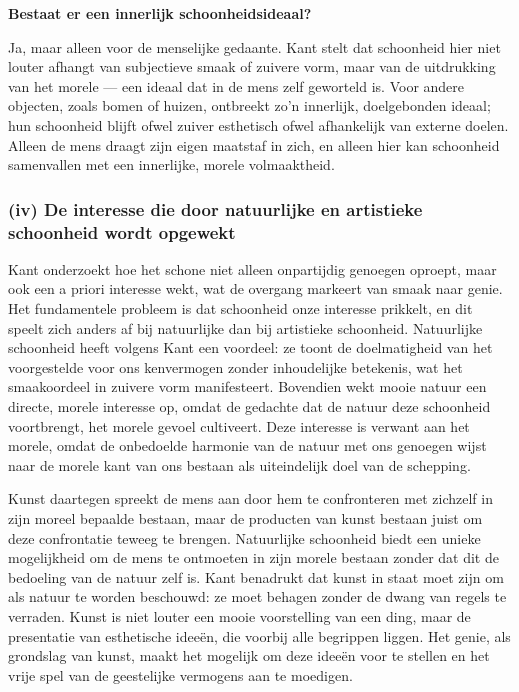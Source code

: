 \documentclass[11pt,twoside,openright]{memoir}
\begin{document}
\bigskip
\noindent
\textbf{Bestaat er een innerlijk schoonheidsideaal?}
\medskip

Ja, maar alleen voor de menselijke gedaante. Kant stelt dat schoonheid hier niet louter afhangt van subjectieve smaak of zuivere vorm, maar van de uitdrukking van het morele — een ideaal dat in de mens zelf geworteld is. Voor andere objecten, zoals bomen of huizen, ontbreekt zo’n innerlijk, doelgebonden ideaal; hun schoonheid blijft ofwel zuiver esthetisch ofwel afhankelijk van externe doelen. Alleen de mens draagt zijn eigen maatstaf in zich, en alleen hier kan schoonheid samenvallen met een innerlijke, morele volmaaktheid.

\subsubsection{(iv) De interesse die door natuurlijke en artistieke schoonheid wordt opgewekt}

Kant onderzoekt hoe het schone niet alleen onpartijdig genoegen oproept, maar ook een a priori interesse wekt, wat de overgang markeert van smaak naar genie. Het fundamentele probleem is dat schoonheid onze interesse prikkelt, en dit speelt zich anders af bij natuurlijke dan bij artistieke schoonheid. Natuurlijke schoonheid heeft volgens Kant een voordeel: ze toont de doelmatigheid van het voorgestelde voor ons kenvermogen zonder inhoudelijke betekenis, wat het smaakoordeel in zuivere vorm manifesteert. Bovendien wekt mooie natuur een directe, morele interesse op, omdat de gedachte dat de natuur deze schoonheid voortbrengt, het morele gevoel cultiveert. Deze interesse is verwant aan het morele, omdat de onbedoelde harmonie van de natuur met ons genoegen wijst naar de morele kant van ons bestaan als uiteindelijk doel van de schepping.

Kunst daartegen spreekt de mens aan door hem te confronteren met zichzelf in zijn moreel bepaalde bestaan, maar de producten van kunst bestaan juist om deze confrontatie teweeg te brengen. Natuurlijke schoonheid biedt een unieke mogelijkheid om de mens te ontmoeten in zijn morele bestaan zonder dat dit de bedoeling van de natuur zelf is. Kant benadrukt dat kunst in staat moet zijn om als natuur te worden beschouwd: ze moet behagen zonder de dwang van regels te verraden. Kunst is niet louter een mooie voorstelling van een ding, maar de presentatie van esthetische ideeën, die voorbij alle begrippen liggen. Het genie, als grondslag van kunst, maakt het mogelijk om deze ideeën voor te stellen en het vrije spel van de geestelijke vermogens aan te moedigen.
\end{document}
